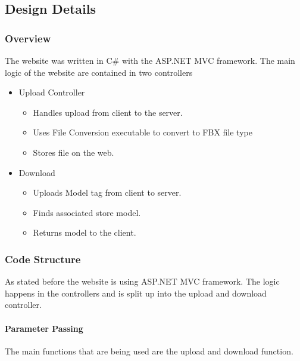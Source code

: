 \subsection{Design Details}

    \subsubsection{Overview}

    The website was written in C\# with the ASP.NET MVC framework. The main logic
    of the website are contained in two controllers
    \begin{itemize}
        \item Upload Controller
        \begin{itemize}
            \item Handles upload from client to the server.
            \item Uses File Conversion executable to convert to FBX file type
            \item Stores file on the web.
        \end{itemize}
        \item Download
        \begin{itemize}
            \item Uploads Model tag from client to server.
            \item Finds associated store model.
            \item Returns model to the client.
        \end{itemize}
    \end{itemize}

    \subsubsection{Code Structure}
    As stated before the website is using ASP.NET MVC framework. 
    The logic happens in the controllers and is split up into the upload and download controller.
    
    \paragraph{Parameter Passing}
    \hfill \break
    The main functions that are being used are the upload and download function.
    
